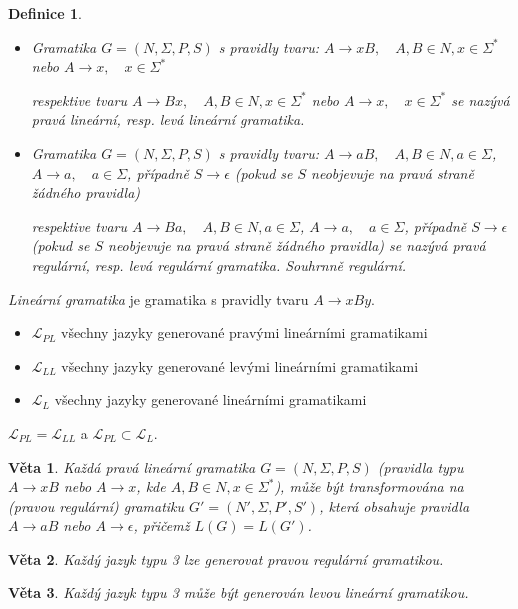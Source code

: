 \documentclass[a4paper, 11pt]{report}
\newtheorem{mydef}{Definice}[chapter]
\newtheorem{veta}{Věta}[chapter]
\begin{document}
\begin{mydef}
\begin{itemize}
	\item Gramatika $G = (N, \Sigma, P, S)$ s pravidly tvaru:
	$A \to xB, \quad A, B \in N, x \in \Sigma^*$ nebo
	$A \to x, \quad x \in \Sigma^*$

	respektive tvaru
	$A \to Bx, \quad A, B \in N, x \in \Sigma^*$ nebo
	$A \to x, \quad x \in \Sigma^*$
	se nazývá \emph{pravá lineární}, resp. \emph{levá lineární} gramatika.
	\item Gramatika $G = (N, \Sigma, P, S)$ s pravidly tvaru:
	$A \to aB, \quad A, B \in N, a \in \Sigma$,
	$A \to a, \quad a \in \Sigma$, případně
	$S \to \epsilon$ (pokud se $S$ neobjevuje na pravá straně žádného pravidla)

	respektive tvaru
	$A \to Ba, \quad A, B \in N, a \in \Sigma$,
	$A \to a, \quad a \in \Sigma$, případně
	$S \to \epsilon$ (pokud se $S$ neobjevuje na pravá straně žádného pravidla)
	se nazývá \emph{pravá regulární}, resp. \emph{levá regulární} gramatika. Souhrnně \emph{regulární}.
\end{itemize}
\end{mydef}

\emph{Lineární gramatika} je gramatika s pravidly tvaru $A \to xBy$.
\begin{itemize}
	\item $\mathcal{L}_{PL}$ všechny jazyky generované pravými lineárními gramatikami
	\item $\mathcal{L}_{LL}$ všechny jazyky generované levými lineárními gramatikami
	\item $\mathcal{L}_{L}$ všechny jazyky generované lineárními gramatikami
\end{itemize}
$\mathcal{L}_{PL} = \mathcal{L}_{LL}$ a $\mathcal{L}_{PL} \subset \mathcal{L}_{L}$.

\begin{veta}
Každá pravá lineární gramatika $G = (N, \Sigma, P, S)$ (pravidla typu $A \to xB$ nebo $A \to x$, kde $A, B \in N, x \in \Sigma^*$), může být transformována na (pravou regulární) gramatiku $G' = (N', \Sigma, P', S')$, která obsahuje pravidla $A \to aB$ nebo $A \to \epsilon$, přičemž $L(G) = L(G')$.
\end{veta}

\begin{veta}
Každý jazyk typu 3 lze generovat pravou regulární gramatikou.
\end{veta}

\begin{veta}
Každý jazyk typu 3 může být generován levou lineární gramatikou.
\end{veta}
\end{document}
